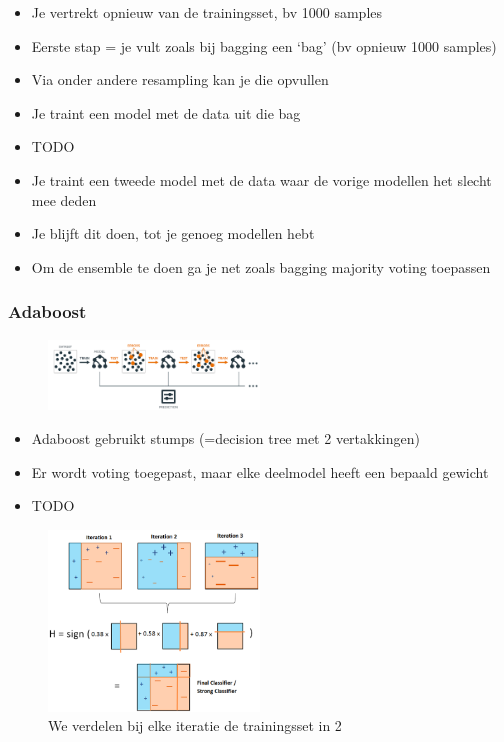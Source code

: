 \documentclass{article}
\begin{document}
\begin{itemize}
    \item Je vertrekt opnieuw van de trainingsset, bv 1000 samples
    \item Eerste stap = je vult zoals bij bagging een `bag' (bv opnieuw 1000 samples)
    \item Via onder andere resampling kan je die opvullen
    \item Je traint een model met de data uit die bag
    \item TODO
    \item Je traint een tweede model met de data waar de vorige modellen het slecht mee deden
    \item Je blijft dit doen, tot je genoeg modellen hebt
    \item Om de ensemble te doen ga je net zoals bagging majority voting toepassen
\end{itemize}

\subsubsection{Adaboost}

\begin{figure}[H]
    \centering
    \includegraphics[width=0.5\textwidth]{adaboost.png}
    \caption{}
\end{figure}


\begin{itemize}
    \item Adaboost gebruikt stumps (=decision tree met 2 vertakkingen)
    \item Er wordt voting toegepast, maar elke deelmodel heeft een bepaald gewicht
    \item TODO
\end{itemize}

\begin{figure}[H]
    \centering
    \includegraphics[width=0.5\textwidth]{adaboost2.png}
    \caption{We verdelen bij elke iteratie de trainingsset in 2}
\end{figure}
\end{document}
